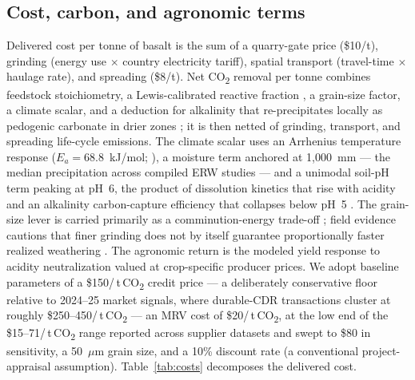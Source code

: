 \documentclass[12pt]{article}
\newcommand{\tco}{\,t\,CO\textsubscript{2}}
\newcommand{\co}{CO\textsubscript{2}}
\begin{document}
\subsection{Cost, carbon, and agronomic terms}
Delivered cost per tonne of basalt is the sum of a quarry-gate price
(\$10/t), grinding (energy use $\times$ country electricity tariff), spatial
transport (travel-time $\times$ haulage rate), and spreading (\$8/t). Net \co{}
removal per tonne combines feedstock stoichiometry, a Lewis-calibrated reactive
fraction \citep{lewis2021}, a grain-size factor, a climate scalar, and a
deduction for alkalinity that re-precipitates locally as pedogenic carbonate in
drier zones \citep{zamanian2016,huang2024}; it is then netted of grinding,
transport, and spreading life-cycle emissions. The climate scalar uses an
Arrhenius temperature response ($E_a = 68.8$~kJ/mol;
\citealp{whiteblum1995,brantley2023,deng2022}), a moisture term anchored at
1{,}000~mm --- the median precipitation across compiled ERW studies
\citep{suhrhoff2026esroc} --- and a unimodal soil-pH term peaking at pH~6, the
product of dissolution kinetics that rise with acidity \citep{palandri2004} and
an alkalinity carbon-capture efficiency that collapses below pH~5
\citep{bertagni2022,holden2024,power2025}. The grain-size lever is carried
primarily as a comminution-energy trade-off \citep{strefler2018}; field evidence
cautions that finer grinding does not by itself guarantee proportionally faster
realized weathering \citep{harrington2023,suhrhoff2026esroc}. The agronomic
return is the modeled yield response to acidity neutralization valued at
crop-specific producer prices. We adopt baseline parameters of a \$150/\tco{}
credit price --- a deliberately conservative floor relative to 2024--25 market
signals, where durable-CDR transactions cluster at roughly \$250--450/\tco{}
\citep{cdrfyi2025} --- an MRV cost of \$20/\tco{}, at the low end of the
\$15--71/\tco{} range reported across supplier datasets \citep{mercer2024} and
swept to \$80 in sensitivity, a 50~$\mu$m grain size, and a 10\% discount rate
(a conventional project-appraisal assumption). Table~\ref{tab:costs} decomposes
the delivered cost.
\end{document}

